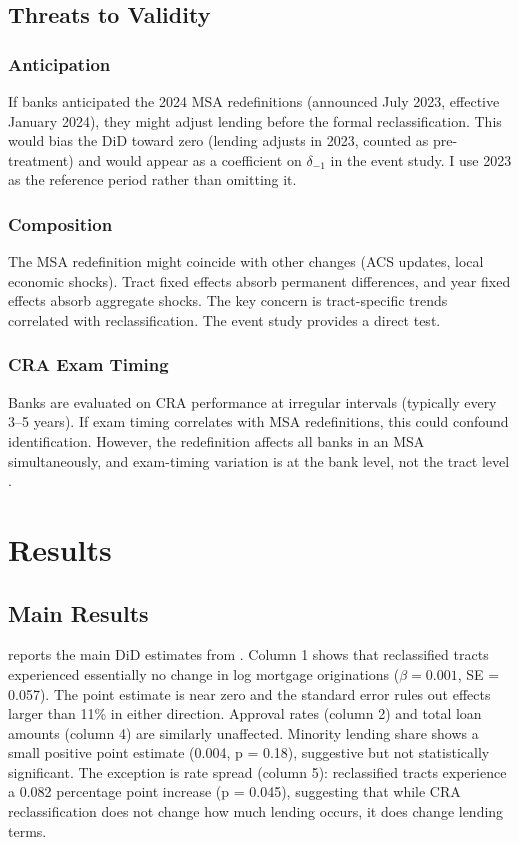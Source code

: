 \documentclass[12pt]{article}
\begin{document}
\subsection{Threats to Validity}

\subsubsection*{Anticipation} If banks anticipated the 2024 MSA redefinitions (announced July 2023, effective January 2024), they might adjust lending before the formal reclassification. This would bias the DiD toward zero (lending adjusts in 2023, counted as pre-treatment) and would appear as a coefficient on $\delta_{-1}$ in the event study. I use 2023 as the reference period rather than omitting it.

\subsubsection*{Composition} The MSA redefinition might coincide with other changes (ACS updates, local economic shocks). Tract fixed effects absorb permanent differences, and year fixed effects absorb aggregate shocks. The key concern is tract-specific trends correlated with reclassification. The event study provides a direct test.

\subsubsection*{CRA Exam Timing} Banks are evaluated on CRA performance at irregular intervals (typically every 3--5 years). If exam timing correlates with MSA redefinitions, this could confound identification. However, the redefinition affects all banks in an MSA simultaneously, and exam-timing variation is at the bank level, not the tract level \citep{agarwal2012did}.

\section{Results}

\subsection{Main Results}



 reports the main DiD estimates from . Column 1 shows that reclassified tracts experienced essentially no change in log mortgage originations ($\beta = 0.001$, SE = 0.057). The point estimate is near zero and the standard error rules out effects larger than 11\% in either direction. Approval rates (column 2) and total loan amounts (column 4) are similarly unaffected. Minority lending share shows a small positive point estimate (0.004, p = 0.18), suggestive but not statistically significant. The exception is rate spread (column 5): reclassified tracts experience a 0.082 percentage point increase (p = 0.045), suggesting that while CRA reclassification does not change how much lending occurs, it does change lending terms.
\end{document}
